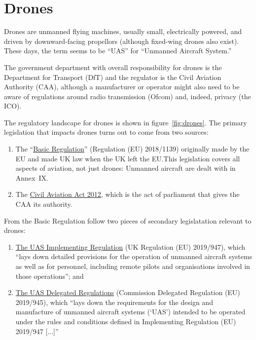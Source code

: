 \documentclass[12pt, a4paper]{article}
\begin{document}
\section{Drones}

Drones are unmanned flying machines, usually small, electrically
powered, and driven by downward-facing propellors (although fixed-wing
drones also exist). These days, the term seems to be ``UAS'' for
``Unmanned Aircraft System.''

The government department with overall responsibility for drones is
the Department for Transport (DfT) and the regulator is the Civil
Aviation Authority (CAA), although a manufacturer or operator might
also need to be aware of regulations around radio transmission (Ofcom)
and, indeed, privacy (the ICO).

The regulatory landscape for drones is shown in
figure~\ref{fig:drones}. The primary legislation that impacts drones
turns out to come from two sources:
\begin{enumerate}
\item The
  ``\href{https://www.legislation.gov.uk/eur/2018/1139/contents}{Basic
    Regulation}'' (Regulation (EU) 2018/1139) originally made by the
  EU and made UK law when the UK left the EU.\@ This legislation
  covers all aspects of aviation, not just drones: Unmanned aircraft
  are dealt with in Annex~IX.\@
\item The
  \href{https://www.legislation.gov.uk/ukpga/1982/16/contents}{Civil
    Aviation Act 2012}, which is the act of parliament that gives the
  CAA its authority.
\end{enumerate}

From the Basic Regulation follow two pieces of secondary legislatation
relevant to drones:
\begin{enumerate}
\item \href{https://www.legislation.gov.uk/eur/2019/947/contents}{The
    UAS Implementing Regulation} (UK Regulation (EU) 2019/947), which
  ``lays down detailed provisions for the operation of unmanned
  aircraft systems as well as for personnel, including remote pilots
  and organisations involved in those operations''; and
\item
  \href{https://www.legislation.gov.uk/eur/2019/945/contents}{The UAS
    Delegated Regulations} (Commission
    Delegated Regulation (EU) 2019/945), which ``lays down the requirements for the design and
  manufacture of unmanned aircraft systems (‘UAS’) intended to be
  operated under the rules and conditions defined in Implementing
  Regulation (EU) 2019/947 [...]''
\end{enumerate}
\end{document}
